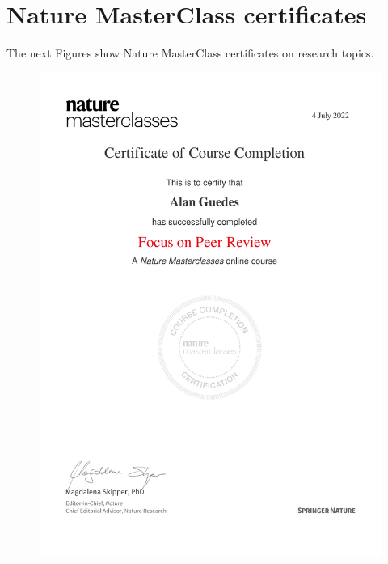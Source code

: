 \documentclass[10pt,a4paper,sans,colorlinks]{moderncv}
\begin{document}
\newpage
\section{Nature MasterClass certificates}
The next Figures show Nature MasterClass certificates on research topics.

\begin{figure}
    \centering
    \includegraphics[align=t,width=\textwidth,height=0.45\textheight, keepaspectratio=true]{certificates/Focus_on_Peer_Review.pdf}

\end{figure}
\end{document}
